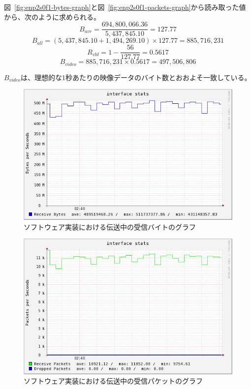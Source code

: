 図~\ref{fig:enp2s0f1-bytes-graph}と図~\ref{fig:enp2s0f1-packets-graph}から読み取った値から、次のように求められる。
\[ B_{avr} = \frac{694,800,066.36}{5,437,845.10} = 127.77 \]
\[ B_{all} = (5,437,845.10 + 1,494,269.10) \times 127.77 = 885,716,231 \]
\[ R_{vld} = 1 - \frac{56}{127.77} = 0.5617 \]
\[ B_{video} = 885,716,231 \times 0.5617 = 497,506,806 \]

$B_{video}$は、理想的な1秒あたりの映像データのバイト数とおおよそ一致している。

\begin{figure}[htbp]
  \begin{center}
    \includegraphics[bb=0 0 597 374,width=11.8cm]{img/lo-bytes-graph.png}
  \end{center}
  \caption{ソフトウェア実装における伝送中の受信バイトのグラフ}
  \label{fig:lo-bytes-graph}
\end{figure}

\begin{figure}[htbp]
  \begin{center}
    \includegraphics[bb=0 0 597 388,width=11.8cm]{img/lo-packets-graph.png}
  \end{center}
  \caption{ソフトウェア実装における伝送中の受信パケットのグラフ}
  \label{fig:lo-packets-graph}
\end{figure}

